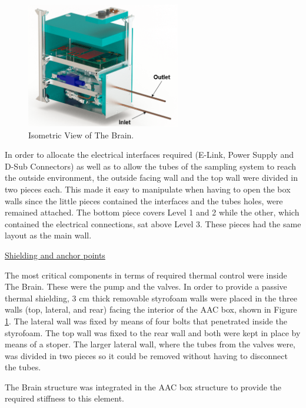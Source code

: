 \begin{figure}[H]
    \centering
    \includegraphics[width=0.6\textwidth]{4-experiment-design/img/Mechanical/Figure_25_0.png}
    \caption{Isometric View of The Brain.}
    \label{brain_isometric}
\end{figure}

\smallskip
In order to allocate the electrical interfaces required (E-Link, Power Supply and D-Sub Connectors) as well as to allow the tubes of the sampling system to reach the outside environment, the outside facing wall and the top wall were divided in two pieces each.  This made it easy to manipulate when having to open the box walls since the little pieces contained the interfaces and the tubes holes, were remained attached. The bottom piece covers Level 1 and 2 while the other, which contained the electrical connections, sat above Level 3. These pieces had the same layout as the main wall. 



\bigskip
\underline{Shielding and anchor points}

\smallskip
The most critical components in terms of required thermal control were inside The Brain. These were the pump and the valves. In order to provide a passive thermal shielding, 3 cm thick removable styrofoam walls were placed in the three walls (top, lateral, and rear) facing the interior of the AAC box, shown in Figure \ref{brain_isometric}. The lateral wall was fixed by means of four bolts that penetrated inside the styrofoam. The top wall was fixed to the rear wall and both were kept in place by means of a stoper. The larger lateral wall, where the tubes from the valves were, was divided in two pieces so it could be removed without having to disconnect the tubes. 

\smallskip
The Brain structure was integrated in the AAC box structure to provide the required stiffness to this element. 


